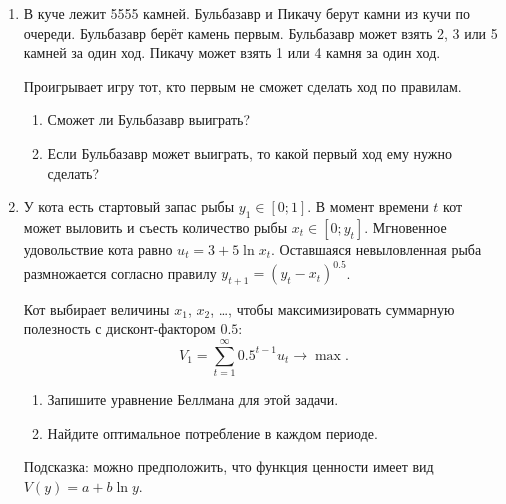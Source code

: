 \documentclass[12pt]{article}
\begin{document}
\begin{enumerate}
    \item 
        В куче лежит 5555 камней.
        Бульбазавр и Пикачу берут камни из кучи по очереди.
        Бульбазавр берёт камень первым.
        Бульбазавр может взять 2, 3 или 5 камней за один ход.
        Пикачу может взять 1 или 4 камня за один ход.
        
        Проигрывает игру тот, кто первым не сможет сделать ход по правилам.
        \begin{enumerate}
         \item Сможет ли Бульбазавр выиграть?
         \item Если Бульбазавр может выиграть, то какой первый ход ему нужно сделать?
        \end{enumerate}
    \item У кота есть стартовый запас рыбы $y_1 \in [0;1]$.
    В момент времени $t$ кот может выловить и съесть количество рыбы $x_t \in [0; y_t]$.
    Мгновенное удовольствие кота равно $u_t = 3 + 5\ln x_t$.
    Оставшаяся невыловленная рыба размножается согласно правилу $y_{t+1} = (y_t - x_t)^{0.5}$.

    Кот выбирает величины $x_1$, $x_2$, \ldots, чтобы максимизировать 
    суммарную полезность с дисконт-фактором $0.5$:
    \[
     V_1 = \sum_{t=1}^{\infty} 0.5^{t-1} u_t \to \max.
    \]

    \begin{enumerate}
        \item Запишите уравнение Беллмана для этой задачи. 
        \item Найдите оптимальное потребление в каждом периоде. 
    \end{enumerate}
    
 
 
    Подсказка: можно предположить, что функция ценности имеет вид $V(y) = a + b \ln y$.


\end{enumerate}


\newpage
\end{document}
